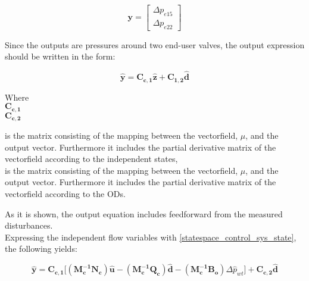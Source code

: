 \begin{equation}
\bm{y} =
\begin{bmatrix} 
\Delta p_{e15} \\
\Delta p_{e22} 
\label{outputvector_control}
\end{bmatrix} 
\end{equation}

Since the outputs are pressures around two end-user valves, the output expression should be written in the form:

\begin{equation}
  \bm{\hat{y}} = \bm{C_{c,1}} \bm{\hat{z}} + \bm{C_{1,2}} \bm{\hat{d}}  
   \label{statespace_control_output}
\end{equation}

\begin{minipage}[t]{0.20\textwidth}
Where\\
\hspace*{8mm} $\bm{C_{c,1}}$ \\
\newline
\newline
\newline
\hspace*{8mm} $\bm{C_{c,2}}$ 
\end{minipage}
\begin{minipage}[t]{0.78\textwidth}
\vspace*{2mm}
is the matrix consisting of the mapping between the vectorfield, $\mu$, and the output vector. Furthermore it includes the partial derivative matrix of the vectorfield according to the independent states, \\
is the matrix consisting of the mapping between the vectorfield, $\mu$, and the output vector. Furthermore it includes the partial derivative matrix of the vectorfield according to the ODs.
\end{minipage}

As it is shown, the output equation includes feedforward from the measured disturbances. 
\\
Expressing the independent flow variables with \eqref{statespace_control_sys_state}, the following yields: 

\begin{equation}
  \bm{\hat{y}} = \bm{C_{c,1}} \big[ (\bm{M_c^{-1}}\bm{N_c}) \bm{\hat{u}} - (\bm{M_c^{-1}}\bm{Q_c}) \bm{\hat{d}} - (\bm{M_c^{-1}}\bm{B_o}) \Delta \hat{p}_{wt}\big] + \bm{C_{c,2}} \bm{\hat{d}}  
   \label{statespace_control_output}
\end{equation}

